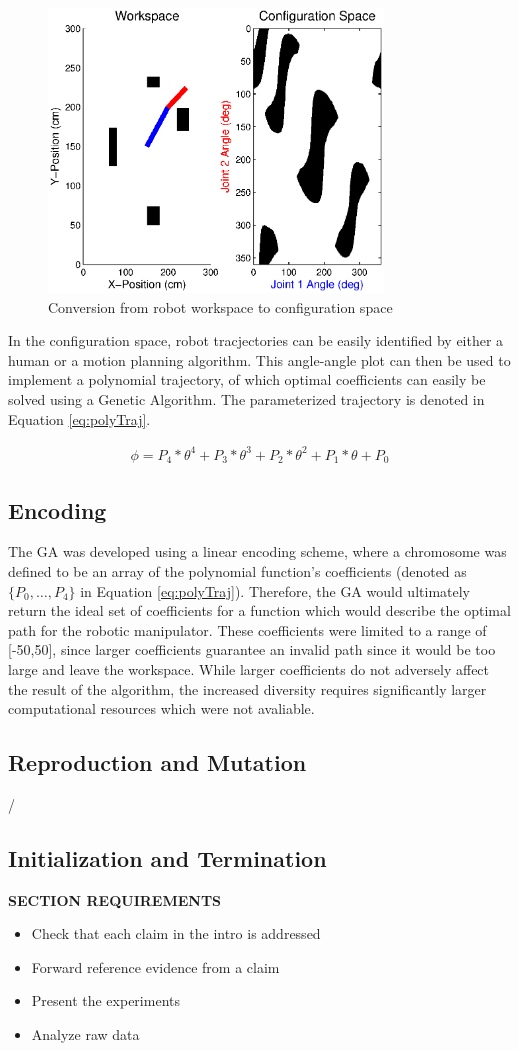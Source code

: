 \begin{figure}[h]
	\centering
	\includegraphics[width=3.5in]{./figures/wp2cs.eps}
	\caption{Conversion from robot workspace to configuration space }
	\label{fig:ws2cs}
\end{figure}

In the configuration space, robot tracjectories can be easily identified by either a human or a motion planning algorithm. This angle-angle plot can then be used to implement a polynomial trajectory, of which optimal coefficients can easily be solved using a Genetic Algorithm. The parameterized trajectory is denoted in Equation \ref{eq:polyTraj}.

\begin{align} \label{eq:polyTraj}
	\phi = P_4*\theta^4 + P_3*\theta^3 + P_2*\theta^2 + P_1*\theta + P_0
\end{align}

\subsection{Encoding}
The GA was developed using a linear encoding scheme, where a chromosome was defined to be an array of the polynomial function's coefficients (denoted as $\{P_0, \ldots, P_4\}$ in Equation \ref{eq:polyTraj}). Therefore, the GA would ultimately return the ideal set of coefficients for a function which would describe the optimal path for the robotic manipulator. These coefficients were limited to a range of [-50,50], since larger coefficients guarantee an invalid path since it would be too large and leave the workspace. While larger coefficients do not adversely affect the result of the algorithm, the increased diversity requires significantly larger computational resources which were not avaliable.

\subsection{Reproduction and Mutation}
/

\subsection{Initialization and Termination}



\textbf{SECTION REQUIREMENTS}
\begin{itemize}
\item Check that each claim in the intro is addressed
\item Forward reference evidence from a claim
\item Present the experiments
\item Analyze raw data
\end{itemize}